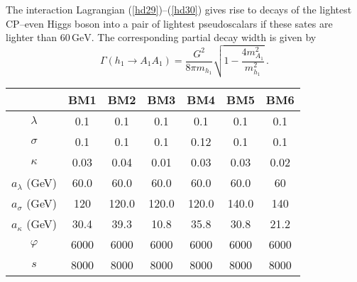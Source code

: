 \documentclass[12pt,a4paper]{article}
\begin{document}
The interaction Lagrangian (\ref{hd29})--(\ref{hd30}) gives rise to decays of the lightest CP--even Higgs boson into
a pair of lightest pseudoscalars if these sates are lighter than $60\,\mbox{GeV}$. The corresponding partial decay width is given by
\begin{equation}
\Gamma(h_1\to A_1 A_1)=\dfrac{G^2}{8\pi m_{h_1}}\sqrt{1-\dfrac{4 m_{A_1}^2}{m_{h_1}^2}}\,.
\label{31}
\end{equation}






\begin{table}
  \noindent \begin{tabular}{| c || c | c |c| c| c| c |}
\hline
                                  &    BM1                 &  BM2         &     BM3          &    BM4            &     BM5         &   BM6           \\   
\hline                                                                                                                                       
$\lambda$                         &    0.1                  & 0.1          & 	0.1           &    0.1             &    0.1              & 	0.1   \\    
$\sigma$                          &    0.1                  & 0.1          &    0.1           &    0.12           & 	0.1              & 	0.1   \\    
$\kappa$                          &    0.03                 & 0.04         & 	0.01           &    0.03            & 	0.03             & 	0.02  \\    
$a_{\lambda}$ (GeV) 	          &    60.0                 & 60.0         & 	60.0            &   60.0             &  60.0             & 	60    \\    
$a_{\sigma}$ (GeV) 	          &    120                  & 120.0        & 	120.0           &   120.0            & 	140.0             & 	140    \\    
$a_{\kappa}$ (GeV) 	          &    30.4                 & 39.3         & 	10.8             &   35.8           &  	30.8             & 	21.2    \\    
\hline
$\varphi$                         &    6000                 &  6000        & 	6000             &   6000          & 	6000             & 	6000   \\    
$s$                   	         &     8000                 &  8000        & 	8000             &   8000          &    8000             & 	8000   \\    

\end{tabular}
\end{table}
\end{document}
